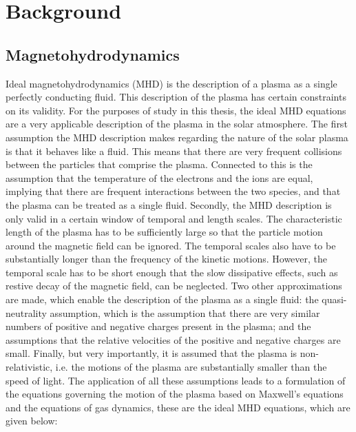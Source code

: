 \documentclass[a4paper,12pt,fourier,authoryear,custommargin]{Classes/PhDThesisPSnPDF}
\renewcommand{\vec}{\mathbf}
\begin{document}
%
\clearpage{}%
\chapter{Background}\label{ch:background}  %


\section{Magnetohydrodynamics}\label{sec:MHD}

Ideal magnetohydrodynamics (MHD) is the description of a plasma as a single perfectly conducting fluid.
This description of the plasma has certain constraints on its validity.
For the purposes of study in this thesis, the ideal MHD equations are a very applicable description of the plasma in the solar atmosphere.
The first assumption the MHD description makes regarding the nature of the solar plasma is that it behaves like a fluid.
This means that there are very frequent collisions between the particles that comprise the plasma.
Connected to this is the assumption that the temperature of the electrons and the ions are equal, implying that there are frequent interactions between the two species, and that the plasma can be treated as a single fluid.
Secondly, the MHD description is only valid in a certain window of temporal and length scales.
The characteristic length of the plasma has to be sufficiently large so that the particle motion around the magnetic field can be ignored.
The temporal scales also have to be substantially longer than the frequency of the kinetic motions.
However, the temporal scale has to be short enough that the slow dissipative effects, such as restive decay of the magnetic field, can be neglected.
Two other approximations are made, which enable the description of the plasma as a single fluid: the quasi-neutrality assumption, which is the assumption that there are very similar numbers of positive and negative charges present in the plasma; and the assumptions that the relative velocities of the positive and negative charges are small.
Finally, but very importantly, it is assumed that the plasma is non-relativistic, i.e. the motions of the plasma are substantially smaller than the speed of light.
The application of all these assumptions leads to a formulation of the equations governing the motion of the plasma based on Maxwell's equations and the equations of gas dynamics, these are the ideal MHD equations, which are given below:
\newcommand{\condev}{\left(\frac{\partial}{\partial t} + \vec{v}\cdot\nabla\right)}
\end{document}
